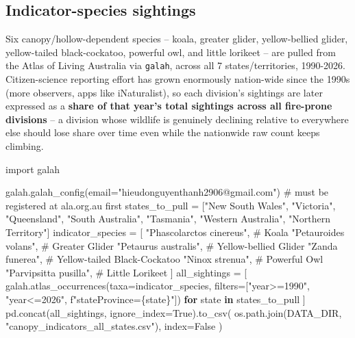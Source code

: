 \documentclass[
  letterpaper,
  DIV=11,
  numbers=noendperiod]{scrartcl}
\newenvironment{Shaded}{\begin{snugshade}}{\end{snugshade}}
\newcommand{\CommentTok}[1]{\textcolor[rgb]{0.37,0.37,0.37}{#1}}
\newcommand{\ControlFlowTok}[1]{\textcolor[rgb]{0.00,0.23,0.31}{\textbf{#1}}}
\newcommand{\ImportTok}[1]{\textcolor[rgb]{0.00,0.46,0.62}{#1}}
\newcommand{\KeywordTok}[1]{\textcolor[rgb]{0.00,0.23,0.31}{\textbf{#1}}}
\newcommand{\NormalTok}[1]{\textcolor[rgb]{0.00,0.23,0.31}{#1}}
\newcommand{\OperatorTok}[1]{\textcolor[rgb]{0.37,0.37,0.37}{#1}}
\newcommand{\SpecialCharTok}[1]{\textcolor[rgb]{0.37,0.37,0.37}{#1}}
\newcommand{\SpecialStringTok}[1]{\textcolor[rgb]{0.13,0.47,0.30}{#1}}
\newcommand{\StringTok}[1]{\textcolor[rgb]{0.13,0.47,0.30}{#1}}
\newcommand{\VariableTok}[1]{\textcolor[rgb]{0.07,0.07,0.07}{#1}}
\begin{document}
\subsection{Indicator-species
sightings}\label{indicator-species-sightings}

Six canopy/hollow-dependent species -- koala, greater glider,
yellow-bellied glider, yellow-tailed black-cockatoo, powerful owl, and
little lorikeet -- are pulled from the Atlas of Living Australia via
\texttt{galah}, across all 7 states/territories, 1990-2026.
Citizen-science reporting effort has grown enormously nation-wide since
the 1990s (more observers, apps like iNaturalist), so each division's
sightings are later expressed as a \textbf{share of that year's total
sightings across all fire-prone divisions} -- a division whose wildlife
is genuinely declining relative to everywhere else should lose share
over time even while the nationwide raw count keeps climbing.

\begin{Shaded}
\begin{Highlighting}[]
\ImportTok{import}\NormalTok{ galah}

\NormalTok{galah.galah\_config(email}\OperatorTok{=}\StringTok{"hieudonguyenthanh2906@gmail.com"}\NormalTok{)  }\CommentTok{\# must be registered at ala.org.au first}
\NormalTok{states\_to\_pull }\OperatorTok{=}\NormalTok{ [}\StringTok{"New South Wales"}\NormalTok{, }\StringTok{"Victoria"}\NormalTok{, }\StringTok{"Queensland"}\NormalTok{, }\StringTok{"South Australia"}\NormalTok{,}
                  \StringTok{"Tasmania"}\NormalTok{, }\StringTok{"Western Australia"}\NormalTok{, }\StringTok{"Northern Territory"}\NormalTok{]}
\NormalTok{indicator\_species }\OperatorTok{=}\NormalTok{ [}
    \StringTok{"Phascolarctos cinereus"}\NormalTok{,  }\CommentTok{\# Koala}
    \StringTok{"Petauroides volans"}\NormalTok{,      }\CommentTok{\# Greater Glider}
    \StringTok{"Petaurus australis"}\NormalTok{,      }\CommentTok{\# Yellow{-}bellied Glider}
    \StringTok{"Zanda funerea"}\NormalTok{,           }\CommentTok{\# Yellow{-}tailed Black{-}Cockatoo}
    \StringTok{"Ninox strenua"}\NormalTok{,           }\CommentTok{\# Powerful Owl}
    \StringTok{"Parvipsitta pusilla"}\NormalTok{,     }\CommentTok{\# Little Lorikeet}
\NormalTok{]}
\NormalTok{all\_sightings }\OperatorTok{=}\NormalTok{ [}
\NormalTok{    galah.atlas\_occurrences(taxa}\OperatorTok{=}\NormalTok{indicator\_species,}
\NormalTok{                             filters}\OperatorTok{=}\NormalTok{[}\StringTok{"year\textgreater{}=1990"}\NormalTok{, }\StringTok{"year\textless{}=2026"}\NormalTok{, }\SpecialStringTok{f"stateProvince=}\SpecialCharTok{\{}\NormalTok{state}\SpecialCharTok{\}}\SpecialStringTok{"}\NormalTok{])}
    \ControlFlowTok{for}\NormalTok{ state }\KeywordTok{in}\NormalTok{ states\_to\_pull}
\NormalTok{]}
\NormalTok{pd.concat(all\_sightings, ignore\_index}\OperatorTok{=}\VariableTok{True}\NormalTok{).to\_csv(}
\NormalTok{    os.path.join(DATA\_DIR, }\StringTok{"canopy\_indicators\_all\_states.csv"}\NormalTok{), index}\OperatorTok{=}\VariableTok{False}
\NormalTok{)}
\end{Highlighting}
\end{Shaded}
\end{document}
